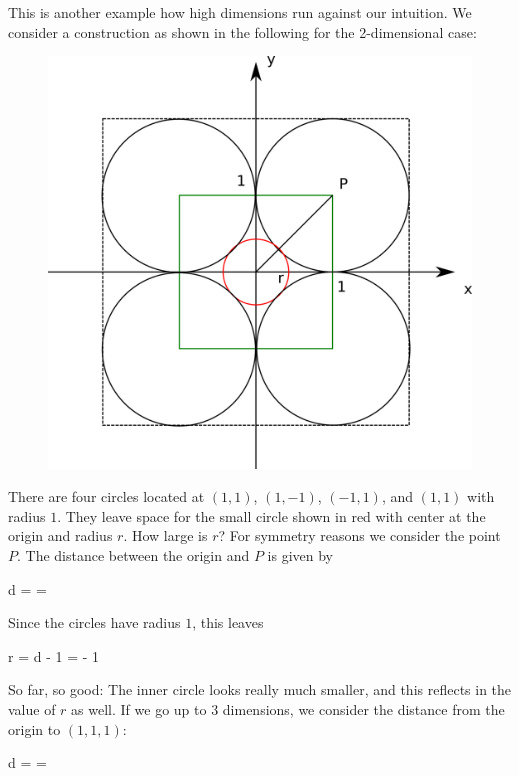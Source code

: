 
This is another example how high dimensions run against our intuition. We consider a construction as shown in the following for the 2-dimensional case:

\begin{figure}[H]
\centering
\includegraphics[scale=0.75]{images/high_dim_03_1.png}
\end{figure}

There are four circles located at $(1,1)$, $(1,-1)$, $(-1,1)$, and $(1,1)$ with radius $1$. They leave space for the small circle shown in red with center at the origin and radius $r$. How large is $r$? For symmetry reasons we consider the point $P$. The distance between the origin and $P$ is given by

\bee
d =  = 
\eee

Since the circles have radius $1$, this leaves

\bee
r = d - 1 =  - 1 
\eee

So far, so good: The inner circle looks really much smaller, and this reflects in the value of $r$ as well. If we go up to 3 dimensions, we consider the distance from the origin to $(1,1,1)$:

\bee
d =  = 
\eee

